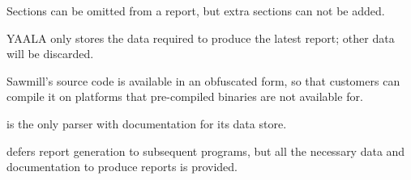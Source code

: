 \begin{table}[htb]
    \begin{eqlist}

        \item [\dag{}] Sections can be omitted from a report, but extra
            sections can not be added.

        \item [\ddag{}] YAALA only stores the data required to produce the
            latest report; other data will be discarded.

        \item [\nialpha{}] Sawmill's source code is available in an
            obfuscated form, so that customers can compile it on platforms
            that pre-compiled binaries are not available for.

        \item [\nibeta{}] \parsername{} is the only parser with
            documentation for its data store.

        \item [\nichi{}] \parsername{} defers report generation to
            subsequent programs, but all the necessary data and
            documentation to produce reports is provided.

    \end{eqlist}

\end{table}

\clearpage{}
